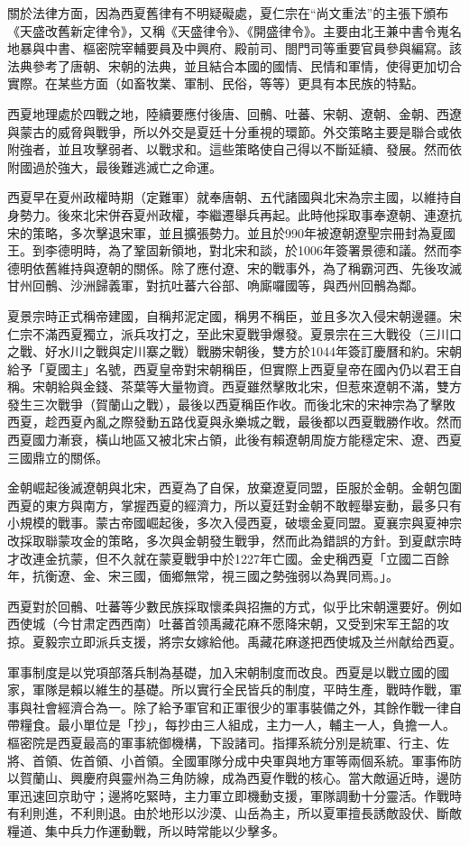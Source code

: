 關於法律方面，因為西夏舊律有不明疑礙處，夏仁宗在“尚文重法”的主張下頒布《天盛改舊新定律令》，又稱《天盛律令》、《開盛律令》。主要由北王兼中書令嵬名地暴與中書、樞密院宰輔要員及中興府、殿前司、閤門司等重要官員參與編寫。該法典參考了唐朝、宋朝的法典，並且結合本國的國情、民情和軍情，使得更加切合實際。在某些方面（如畜牧業、軍制、民俗，等等）更具有本民族的特點。

西夏地理處於四戰之地，陸續要應付後唐、回鶻、吐蕃、宋朝、遼朝、金朝、西遼與蒙古的威脅與戰爭，所以外交是夏廷十分重視的環節。外交策略主要是聯合或依附強者，並且攻擊弱者、以戰求和。這些策略使自己得以不斷延續、發展。然而依附國過於強大，最後難逃滅亡之命運。

西夏早在夏州政權時期（定難軍）就奉唐朝、五代諸國與北宋為宗主國，以維持自身勢力。後來北宋併吞夏州政權，李繼遷舉兵再起。此時他採取事奉遼朝、連遼抗宋的策略，多次擊退宋軍，並且擴張勢力。並且於990年被遼朝遼聖宗冊封為夏國王。到李德明時，為了鞏固新領地，對北宋和談，於1006年簽署景德和議。然而李德明依舊維持與遼朝的關係。除了應付遼、宋的戰事外，為了稱霸河西、先後攻滅甘州回鶻、沙洲歸義軍，對抗吐蕃六谷部、唃廝囉國等，與西州回鶻為鄰。

夏景宗時正式稱帝建國，自稱邦泥定國，稱男不稱臣，並且多次入侵宋朝邊疆。宋仁宗不滿西夏獨立，派兵攻打之，至此宋夏戰爭爆發。夏景宗在三大戰役（三川口之戰、好水川之戰與定川寨之戰）戰勝宋朝後，雙方於1044年簽訂慶曆和約。宋朝給予「夏國主」名號，西夏皇帝對宋朝稱臣，但實際上西夏皇帝在國內仍以君王自稱。宋朝給與金錢、茶葉等大量物資。西夏雖然擊敗北宋，但惹來遼朝不滿，雙方發生三次戰爭（賀蘭山之戰），最後以西夏稱臣作收。而後北宋的宋神宗為了擊敗西夏，趁西夏內亂之際發動五路伐夏與永樂城之戰，最後都以西夏戰勝作收。然而西夏國力漸衰，橫山地區又被北宋占領，此後有賴遼朝周旋方能穩定宋、遼、西夏三國鼎立的關係。

金朝崛起後滅遼朝與北宋，西夏為了自保，放棄遼夏同盟，臣服於金朝。金朝包圍西夏的東方與南方，掌握西夏的經濟力，所以夏廷對金朝不敢輕舉妄動，最多只有小規模的戰事。蒙古帝國崛起後，多次入侵西夏，破壞金夏同盟。夏襄宗與夏神宗改採取聯蒙攻金的策略，多次與金朝發生戰爭，然而此為錯誤的方針。到夏獻宗時才改連金抗蒙，但不久就在蒙夏戰爭中於1227年亡國。金史稱西夏「立國二百餘年，抗衡遼、金、宋三國，偭鄉無常，視三國之勢強弱以為異同焉。」。

西夏對於回鶻、吐蕃等少數民族採取懷柔與招撫的方式，似乎比宋朝還要好。例如西使城（今甘肃定西西南）吐蕃首领禹藏花麻不愿降宋朝，又受到宋军王韶的攻掠。夏毅宗立即派兵支援，將宗女嫁給他。禹藏花麻遂把西使城及兰州献给西夏。

軍事制度是以党項部落兵制為基礎，加入宋朝制度而改良。西夏是以戰立國的國家，軍隊是賴以維生的基礎。所以實行全民皆兵的制度，平時生產，戰時作戰，軍事與社會經濟合為一。除了給予軍官和正軍很少的軍事裝備之外，其餘作戰一律自帶糧食。最小單位是「抄」，每抄由三人組成，主力一人，輔主一人，負擔一人。樞密院是西夏最高的軍事統御機構，下設諸司。指揮系統分別是統軍、行主、佐將、首領、佐首領、小首領。全國軍隊分成中央軍與地方軍等兩個系統。軍事佈防以賀蘭山、興慶府與靈州為三角防線，成為西夏作戰的核心。當大敵逼近時，邊防軍迅速回京助守；邊將吃緊時，主力軍立即機動支援，軍隊調動十分靈活。作戰時有利則進，不利則退。由於地形以沙漠、山岳為主，所以夏軍擅長誘敵設伏、斷敵糧道、集中兵力作運動戰，所以時常能以少擊多。

